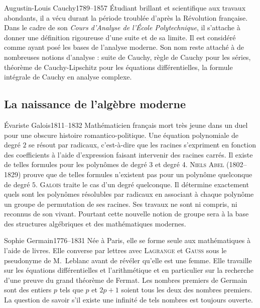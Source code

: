 \documentclass[10pt,class=article,crop=false]{standalone}
\begin{document}
\begin{multicols}{2}
\begin{biographie}{Augustin-Louis Cauchy}{1789--1857}
\'Etudiant brillant et scientifique aux travaux abondants, il a vécu durant la période troublée d'après la Révolution française.
Dans le cadre de son \emph{Cours d’Analyse de l’École Polytechnique}, il s’attache à donner une définition rigoureuse d’une suite et de sa limite. Il est considéré comme ayant posé les bases de l’analyse moderne.
Son nom reste attaché à de nombreuses notions d'analyse : suite de Cauchy, règle de Cauchy pour les séries, théorème de Cauchy-Lipschitz pour les équations différentielles,  la formule intégrale de Cauchy en analyse complexe.
\end{biographie}


\subsection{La naissance de l'algèbre moderne}

\begin{biographie}{Évariste Galois}{1811--1832}
Mathématicien français mort très jeune dans un duel pour une obscure histoire romantico-politique. Une équation polynomiale de degré $2$ se résout \og{}par radicaux\fg{}, c'est-à-dire que les racines s'expriment en fonction des coefficients à l'aide d'expression faisant intervenir des racines carrés.  Il existe de telles formules pour les polynômes de degré 3  et degré 4. \textsc{Niels Abel} (1802--1829) prouve que de telles formules n'existent pas pour un polynôme quelconque de degré $5$. \textsc{Galois} traite le cas d'un degré quelconque. Il détermine exactement quels sont les polynômes résolubles par radicaux en associant à chaque polynôme un groupe de permutation de ses racines. Ses travaux ne sont ni compris, ni reconnus de son vivant. Pourtant cette nouvelle notion de groupe sera à la base des structures algébriques et des mathématiques modernes. 
\end{biographie}


\begin{biographie}{Sophie Germain}{1776--1831}
Née à Paris, elle se forme seule aux mathématiques à l'aide de livres.
Elle converse par lettres avec \textsc{Lagrange} et \textsc{Gauss} sous le pseudonyme de M.~Leblanc avant de révéler qu'elle est une femme.
Elle travaille sur les équations différentielles et l'arithmétique et en particulier sur la recherche d'une preuve du grand théorème de Fermat. 
Les nombres premiers de Germain sont des entiers $p$ tels que $p$ et $2p+1$ soient tous les deux des nombres premiers. La question de savoir s'il existe une infinité de tels nombres est toujours ouverte.
\end{biographie}



\end{multicols}
\end{document}
